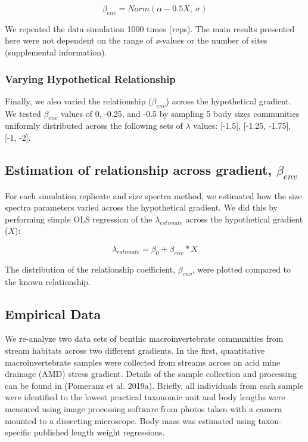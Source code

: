 \documentclass[
]{article}
\begin{document}
\[\beta_{env} = Norm(\alpha -0.5X,~\sigma)\]

We repeated the data simulation 1000 times (reps). The main results
presented here were not dependent on the range of \emph{x}-values or the
number of sites (supplemental information).

\hypertarget{varying-hypothetical-relationship}{%
\subsubsection{Varying Hypothetical
Relationship}\label{varying-hypothetical-relationship}}

Finally, we also varied the relationship (\(\beta_{env}\)) across the
hypothetical gradient. We tested \(\beta_{env}\) values of 0, -0.25, and
-0.5 by sampling 5 body sizes communities uniformly distributed across
the following sets of \(\lambda\) values: {[}-1.5{]}, {[}-1.25,
-1.75{]}, {[}-1, -2{]}.

\hypertarget{estimation-of-relationship-across-gradient-beta_env}{%
\subsection{\texorpdfstring{Estimation of relationship across gradient,
\(\beta_{env}\)}{Estimation of relationship across gradient, \textbackslash beta\_\{env\}}}\label{estimation-of-relationship-across-gradient-beta_env}}

For each simulation replicate and size spectra method, we estimated how
the size spectra parameters varied across the hypothetical gradient. We
did this by performing simple OLS regression of the
\(\lambda_{estimate}\) across the hypothetical gradient (\(X\)):

\[\lambda_{estimate} = \beta_0 + \beta_{env} * X\]

The distribution of the relationship coefficient, \(\beta_{env}\), were
plotted compared to the known relationship.

\hypertarget{empirical-data}{%
\subsection{Empirical Data}\label{empirical-data}}

We re-analyze two data sets of benthic macroinvertebrate communities
from stream habitats across two different gradients. In the first,
quantitative macroinvertebrate samples were collected from streams
across an acid mine drainage (AMD) stress gradient. Details of the
sample collection and processing can be found in (Pomeranz et al.
2019a). Briefly, all individuals from each sample were identified to the
lowest practical taxonomic unit and body lengths were measured using
image processing software from photos taken with a camera mounted to a
dissecting microscope. Body mass was estimated using taxon-specific
published length weight regressions.
\end{document}
